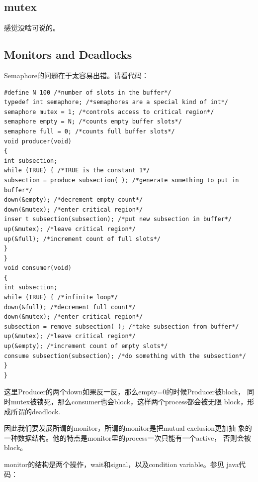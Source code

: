 \documentclass[a4paper]{article}
\begin{document}
\subsection{mutex}
感觉没啥可说的。

\subsection{Monitors and Deadlocks}
Semaphore的问题在于太容易出错。请看代码：

\begin{centering}
\begin{verbatim}
#define N 100 /*number of slots in the buffer*/
typedef int semaphore; /*semaphores are a special kind of int*/
semaphore mutex = 1; /*controls access to critical region*/
semaphore empty = N; /*counts empty buffer slots*/
semaphore full = 0; /*counts full buffer slots*/
void producer(void)
{
int subsection;
while (TRUE) { /*TRUE is the constant 1*/
subsection = produce subsection( ); /*generate something to put in buffer*/
down(&empty); /*decrement empty count*/
down(&mutex); /*enter critical region*/
inser t subsection(subsection); /*put new subsection in buffer*/
up(&mutex); /*leave critical region*/
up(&full); /*increment count of full slots*/
}
}
void consumer(void)
{
int subsection;
while (TRUE) { /*infinite loop*/
down(&full); /*decrement full count*/
down(&mutex); /*enter critical region*/
subsection = remove subsection( ); /*take subsection from buffer*/
up(&mutex); /*leave critical region*/
up(&empty); /*increment count of empty slots*/
consume subsection(subsection); /*do something with the subsection*/
}
}
\end{verbatim}
\end{centering}

这里Producer的两个down如果反一反，那么empty=0的时候Producer被block，
同时mutex被锁死，那么consumer也会block，这样两个process都会被无限
block，形成所谓的deadlock.

因此我们要发展所谓的monitor，所谓的monitor是把mutual exclusion更加抽
象的一种数据结构。他的特点是monitor里的process一次只能有一个active，
否则会被block。

monitor的结构是两个操作，wait和signal，以及condition variable。参见
java代码：
\end{document}
